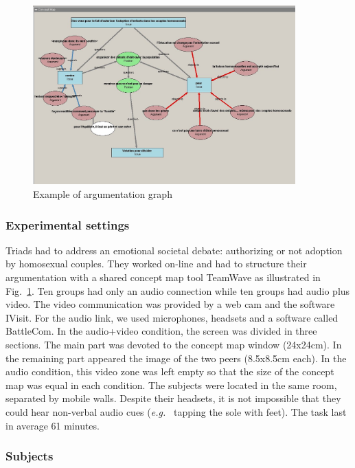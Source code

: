 \documentclass[twocolumn]{article}
\newcommand{\eg}{{\textit{e.g.\ }}}
\begin{document}
\begin{figure}[ht!]
        \centering
        \includegraphics[width=0.9\textwidth]{image8.jpg}
        \caption{Example of argumentation graph}
        \label{study3:argumentation_graph}
\end{figure}


\subsubsection*{Experimental settings} 

Triads had to address an emotional societal debate: authorizing or not adoption
by homosexual couples. They worked on-line and had to structure their
argumentation with a shared concept map tool {\sc TeamWave} as illustrated in
Fig.~\ref{study3:argumentation_graph}. Ten groups had only an audio connection
while ten groups had audio plus video. The video communication was provided by a
web cam and the software {\sc IVisit}. For the audio link, we used microphones,
headsets and a software called {\sc BattleCom}. In the audio+video condition,
the screen was divided in three sections. The main part was devoted to the
concept map window (24x24cm). In the remaining part appeared the image of the
two peers (8.5x8.5cm each). In the audio condition, this video zone was left
empty so that the size of the concept map was equal in each condition. The
subjects were located in the same room, separated by mobile walls. Despite their
headsets, it is not impossible that they could hear non-verbal audio cues (\eg
tapping the sole with feet).  The task last in average 61 minutes.

\subsubsection*{Subjects}
\end{document}
